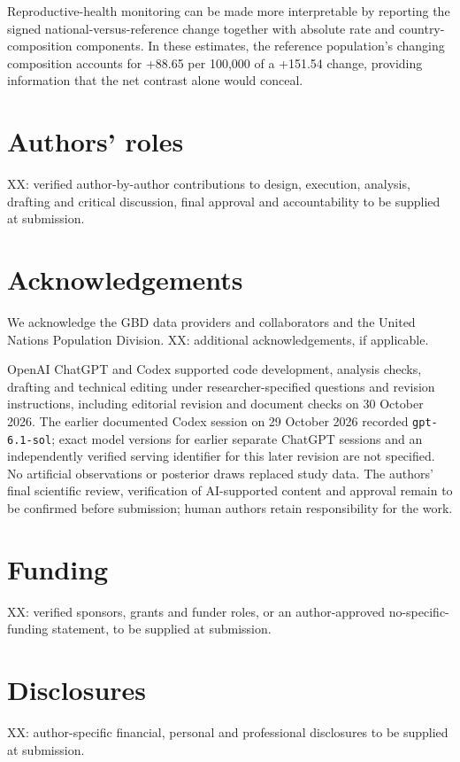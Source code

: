 \documentclass[11pt,a4paper]{article}
\begin{document}
Reproductive-health monitoring can be made more interpretable by reporting the signed national-versus-reference change together with absolute rate and country-composition components. In these estimates, the reference population's changing composition accounts for +88.65 per 100,000 of a +151.54 change, providing information that the net contrast alone would conceal.

\section*{Authors' roles}
XX: verified author-by-author contributions to design, execution, analysis, drafting and critical discussion, final approval and accountability to be supplied at submission.

\section*{Acknowledgements}
We acknowledge the GBD data providers and collaborators and the United Nations Population Division. XX: additional acknowledgements, if applicable.

OpenAI ChatGPT and Codex supported code development, analysis checks, drafting and technical editing under researcher-specified questions and revision instructions, including editorial revision and document checks on 30 October 2026. The earlier documented Codex session on 29 October 2026 recorded \texttt{gpt-6.1-sol}; exact model versions for earlier separate ChatGPT sessions and an independently verified serving identifier for this later revision are not specified. No artificial observations or posterior draws replaced study data. The authors' final scientific review, verification of AI-supported content and approval remain to be confirmed before submission; human authors retain responsibility for the work.

\section*{Funding}
XX: verified sponsors, grants and funder roles, or an author-approved no-specific-funding statement, to be supplied at submission.

\section*{Disclosures}
XX: author-specific financial, personal and professional disclosures to be supplied at submission.
\end{document}
